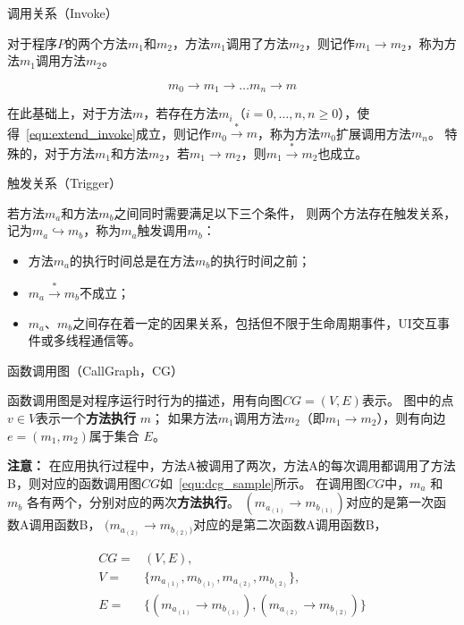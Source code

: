 \begin{myDef}
	调用关系（Invoke）
\end{myDef}
	对于程序$P$的两个方法$m_1$和$m_2$，方法$m_1$调用了方法$m_2$，则记作$m_1 \to m_2$，称为方法$m_1$调用方法$m_2$。

\begin{equation}
m_0 \to m_1 \to \dots m_n \to m  \label{equ:extend_invoke}
\end{equation}

在此基础上，对于方法$m$，若存在方法$m_i$（$i=0,\dots,n , n \geqslant 0$），使得~\autoref{equ:extend_invoke}成立，则记作$m_0 \stackrel{\ast}{\to} m$，称为方法$m_0$扩展调用方法$m_n$。
特殊的，对于方法$m_1$和方法$m_2$，若$m_1 \to m_2$，则$m_1  \stackrel{\ast}{\to}  m_2$也成立。

\begin{myDef}
	触发关系（Trigger）
\end{myDef}
	
	若方法$m_a$和方法$m_b$之间同时需要满足以下三个条件，
	则两个方法存在触发关系，记为$m_a \hookrightarrow m_b$，称为$m_a$触发调用$m_b$：
	
	\begin{itemize}
		\item 方法$m_a$的执行时间总是在方法$m_b$的执行时间之前；
		\item $m_a \stackrel{\ast}{\to} m_b $不成立；
		\item $m_a$、$m_b$之间存在着一定的因果关系，包括但不限于生命周期事件，UI交互事件或多线程通信等。
	\end{itemize}


\begin{myDef}
	函数调用图（CallGraph，CG）
\end{myDef}	
	函数调用图是对程序运行时行为的描述，用有向图$CG = ( V , E)$表示。 图中的点$ v \in V $表示一个\textbf{方法执行} $m$；
	如果方法$m_1$调用方法$m_2$（即$m_1 \to m_2$），则有向边 $e = (m_1 ,m_2)$属于集合 $E$。 


\textbf{注意：}
在应用执行过程中，方法A被调用了两次，方法A的每次调用都调用了方法B，则对应的函数调用图$CG$如~\autoref{equ:dcg_sample}所示。
在调用图$CG$中，$m_a$ 和 $m_b$ 各有两个，分别对应的两次\textbf{方法执行}。
$(m_{a_{(1)}} \to m_{b_{(1)}})$对应的是第一次函数A调用函数B，
$(m_{a_{(2)}} \to m_{b_{(2)})}$对应的是第二次函数A调用函数B，

\begin{equation}
\begin{aligned}
CG = &(V,E) ,\\ 
V = & \{m_{a_{(1)}},m_{b_{(1)}},m_{a_{(2)}},m_{b_{(2)}}\}, \\ 
E = & \{  
(  m_{a_{(1)}} \to m_{b_{(1)}}) ,( m_{a_{(2)}} \to m_{b_{(2)}})
\} 
\end{aligned}
\label{equ:dcg_sample} 
\end{equation}



